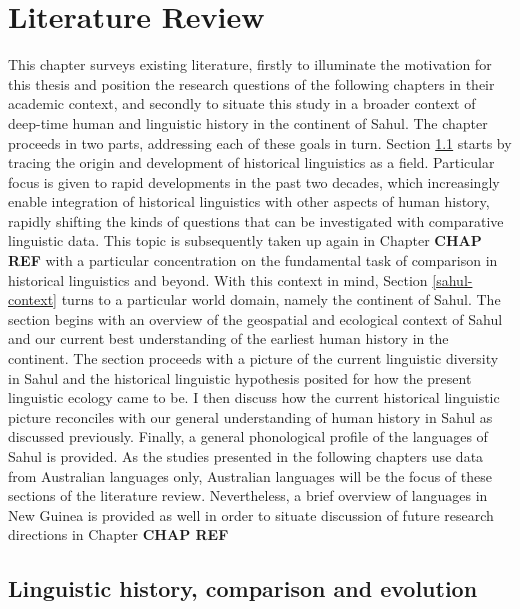 \chapter[Literature review]{Literature Review}
\label{Chap:lit-review}


This chapter surveys existing literature, firstly to illuminate the motivation for this thesis and position the research questions of the following chapters in their academic context, and secondly to situate this study in a broader context of deep-time human and linguistic history in the continent of Sahul. The chapter proceeds in two parts, addressing each of these goals in turn. Section \ref{academic-context} starts by tracing the origin and development of historical linguistics as a field. Particular focus is given to rapid developments in the past two decades, which increasingly enable integration of historical linguistics with other aspects of human history, rapidly shifting the kinds of questions that can be investigated with comparative linguistic data. This topic is subsequently taken up again in Chapter \textbf{CHAP REF} with a particular concentration on the fundamental task of comparison in historical linguistics and beyond. With this context in mind, Section \ref{sahul-context} turns to a particular world domain, namely the continent of Sahul. The section begins with an overview of the geospatial and ecological context of Sahul and our current best understanding of the earliest human history in the continent. The section proceeds with a picture of the current linguistic diversity in Sahul and the historical linguistic hypothesis posited for how the present linguistic ecology came to be. I then discuss how the current historical linguistic picture reconciles with our general understanding of human history in Sahul as discussed previously. Finally, a general phonological profile of the languages of Sahul is provided. As the studies presented in the following chapters use data from Australian languages only, Australian languages will be the focus of these sections of the literature review. Nevertheless, a brief overview of languages in New Guinea is provided as well in order to situate discussion of future research directions in Chapter \textbf{CHAP REF}

\hypertarget{academic-context}{%
\section{Linguistic history, comparison and evolution}\label{academic-context}}

